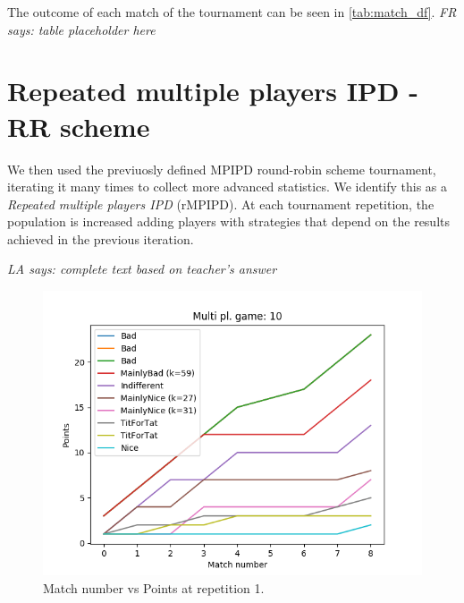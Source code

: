 \documentclass[journal,a4paper,10pt,twoside]{IEEEtran}
\newcommand{\FR}[1]{\textit{\color{ForestGreen}FR says: #1}}
\newcommand{\LA}[1]{\textit{\color{orange}LA says: #1}}
\begin{document}
The outcome of each match of the tournament can be seen in \autoref{tab:match_df}. \FR{table placeholder here}

\newpage %
\section{Repeated multiple players IPD - RR scheme} \label{s:rIPDMP}
We then used the previuosly defined MPIPD round-robin scheme tournament, iterating it many times to collect more advanced statistics.
We identify this as a \textit{Repeated multiple players IPD} (rMPIPD).
At each tournament repetition, the population is increased adding players with strategies that depend on the results achieved in the previous iteration.

\LA{complete text based on teacher's answer}

\begin{figure}[ht]
    \centering
    \includegraphics[width=1\columnwidth]{../img/ripdmp-scores-10-r0.png}
    \caption{Match number vs Points at repetition 1.}
    \label{fig:rmpipd1}
\end{figure}
\end{document}
